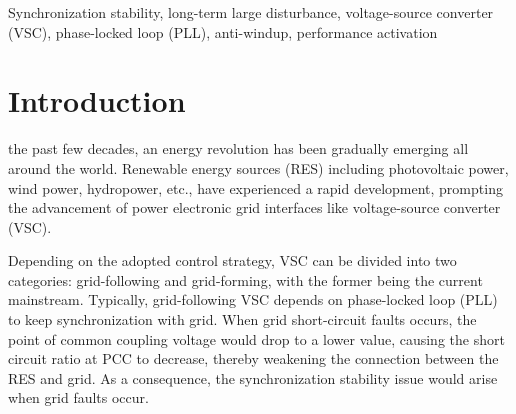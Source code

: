 \documentclass[10pt,final,journal,twoside]{IEEEtran}
\begin{document}
\begin{IEEEkeywords}
Synchronization stability, long-term large disturbance, voltage-source converter (VSC), phase-locked loop (PLL), anti-windup, performance activation
\end{IEEEkeywords}

\section{Introduction}\label{sec:intro}
 the past few decades, an energy revolution has been gradually emerging all around the world. Renewable energy sources (RES) including photovoltaic power, wind power, hydropower, etc.,
have experienced a rapid development, prompting the advancement of power electronic grid interfaces like voltage-source converter (VSC)\cite{bose2017,mansoor2022}.

Depending on the adopted control strategy, VSC can be divided into two categories: grid-following and grid-forming, with the former being the current mainstream\cite{pattabiraman2018}. Typically,
grid-following VSC depends on phase-locked loop (PLL) to keep synchronization with grid. When grid short-circuit faults occurs, the point of common coupling voltage would drop to a lower
value\cite{bookkundur1994}, causing the short circuit ratio at PCC to decrease, thereby weakening the connection between the RES and grid\cite{harnefors2007,zhang2011}. As a consequence, the synchronization
stability issue would arise when grid faults occur\cite{ma2018,he2021}.
\end{document}
